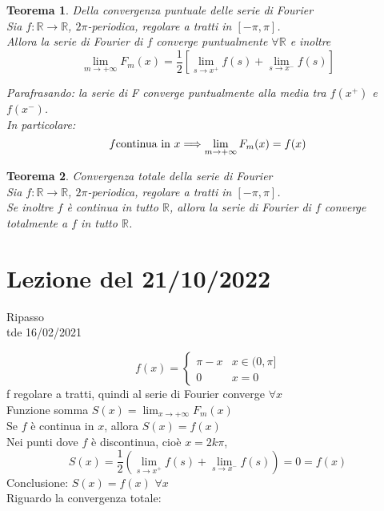 \documentclass{scrreprt}
\newtheorem{teorema}{Teorema}
\newenvironment{thm}{\begin{mdframed}[backgroundcolor=Ivory2]\begin{teorema}}{\end{teorema}\end{mdframed}}
\begin{document}
\begin{thm} Della convergenza puntuale delle serie di Fourier\\
	Sia $f:\mathbb{R}\to\mathbb{R}$, $2\pi$-periodica, regolare a tratti in $[-\pi,\pi]$.\\
	Allora la serie di Fourier di $f$ converge puntualmente $\forall \mathbb{R}$ e inoltre
	\begin{equation}
		\lim_{m\to+\infty} F_m(x) = \frac{1}{2} \left[ \lim_{s\to x^+} f(s) + \lim_{s\to x^-} f(s) \right] 
	\end{equation}

Parafrasando: la serie di F converge puntualmente alla media tra $f(x^+)$ e $f(x^-)$.\\
In particolare:
\begin{equation}
	f \textnormal{continua in } x \Longrightarrow \lim_{m\to+\infty} F_m(x) = f(x)
\end{equation}
\end{thm}

\begin{thm} Convergenza totale della serie di Fourier\\
	Sia $f:\mathbb{R}\to\mathbb{R}$, $2\pi$-periodica, regolare a tratti in $[-\pi,\pi]$.\\
	Se inoltre $f$ è continua in tutto $\mathbb{R}$, allora la serie di Fourier di $f$ converge totalmente a $f$ in tutto $\mathbb{R}$.
\end{thm}



\section{Lezione del 21/10/2022}
Ripasso\\
tde 16/02/2021

\begin{equation}
	f(x) = \begin{cases}
		\pi-x & x \in (0,\pi] \\
		0 & x = 0
	\end{cases}
\end{equation}
f regolare a tratti, quindi al serie di Fourier converge $\forall x$\\
Funzione somma $S(x) = \lim_{x\to+\infty} F_m(x)$\\
Se $f$ è continua in $x$, allora $S(x) = f(x)$\\
Nei punti dove $f$ è discontinua, cioè $x=2k\pi$,\\
\begin{equation}
	S(x)= \frac{1}{2} \left( \lim_{s\to x^+} f(s) + \lim_{s\to x^-} f(s) \right) = 0 = f(x)
\end{equation}
Conclusione: $S(x) = f(x)$ $\forall x$\\
Riguardo la convergenza totale:\\
\end{document}
